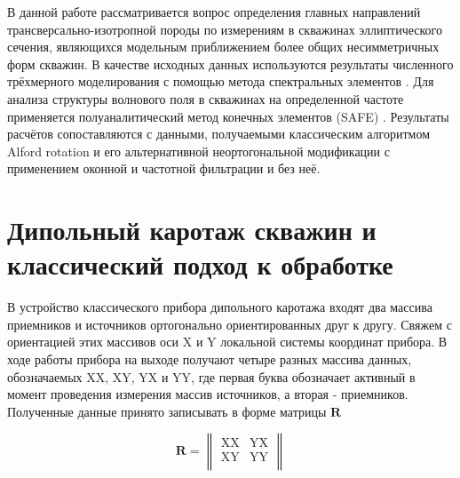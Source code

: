 \documentclass[a4paper,11pt]{article}
\begin{document}
В данной работе рассматривается вопрос определения главных направлений трансверсально-изотропной породы по измерениям в скважинах эллиптического сечения, являющихся модельным приближением более общих несимметричных форм скважин. В качестве исходных данных используются результаты численного трёхмерного моделирования с помощью метода спектральных элементов \cite{Komatitsch2000}. Для анализа структуры волнового поля в скважинах на определенной частоте применяется полуаналитический метод конечных элементов (SAFE) \cite{Bartoli2006}. Результаты расчётов сопоставляются с данными, получаемыми классическим алгоритмом Alford rotation \cite{Alford1986} и его альтернативной неортогональной модификации \cite{Dellinger1998} с применением оконной и частотной фильтрации и без неё.

\section{Дипольный каротаж скважин и классический подход к обработке}
В устройство классического прибора дипольного каротажа входят два массива приемников и источников ортогонально ориентированных друг к другу. Свяжем с ориентацией этих массивов оси X и Y локальной системы координат прибора. В ходе работы прибора на выходе получают четыре разных массива данных, обозначаемых XX, XY, YX и YY, где первая буква обозначает активный в момент проведения измерения массив источников, а вторая - приемников. Полученные данные принято записывать в форме матрицы $\mathbf{R}$ 

$$
	\mathbf{R} = \left\|
	\begin{array}{cc}
	\text{XX} & \text{YX} \\
	\text{XY} & \text{YY} \\
	\end{array}
	\right\| 
$$
\end{document}
